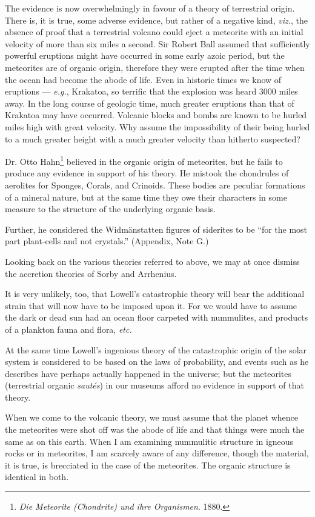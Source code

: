 \documentclass[a4paper, 12pt, oneside]{article}
\begin{document}
The evidence is now overwhelmingly in favour of a theory of terrestrial origin. There is, it is true, some adverse evidence, but rather of a negative kind, \emph{viz.}, the absence of proof that a terrestrial volcano could eject a meteorite with an initial velocity of more than six miles a second. Sir Robert Ball assumed that sufficiently powerful eruptions might have occurred in some early azoic period, but the meteorites are of organic origin, therefore they were erupted after the time when the ocean had become the abode of life. Even in historic times we know of eruptions --- \emph{e.g.}, Krakatoa, so terrific that the explosion was heard 3000 miles away. In the long course of geologic time, much greater eruptions than that of Krakatoa may have occurred. Volcanic blocks and bombs are known to be hurled miles high with great velocity. Why assume the impossibility of their being hurled to a much greater height with a much greater velocity than hitherto suspected?

Dr. Otto Hahn\footnote{\emph{Die Meteorite (Chondrite) und ihre Organismen}. 1880.} believed in the organic origin of meteorites, but he fails to produce any evidence in support of his theory. He mistook the chondrules of aerolites for Sponges, Corals, and Crinoids. These bodies are peculiar formations of a mineral nature, but at the same time they owe their characters in some measure to the structure of the underlying organic basis.

Further, he considered the Widmänstatten figures of siderites to be ``for the most part plant-cells and not crystals.'' (Appendix, Note G.)

Looking back on the various theories referred to above, we may at once dismiss the accretion theories of Sorby and Arrhenius.

It is very unlikely, too, that Lowell's catastrophic theory will bear the additional strain that will now have to be imposed upon it. For we would have to assume the dark or dead sun had an ocean floor carpeted with nummulites, and products of a plankton fauna and flora, \emph{etc.}

At the same time Lowell's ingenious theory of the catastrophic origin of the solar system is considered to be based on the laws of probability, and events such as he describes have perhaps actually happened in the universe; but the meteorites (terrestrial organic \emph{sautés}) in our museums afford no evidence in support of that theory.

When we come to the volcanic theory, we must assume that the planet whence the meteorites were shot off was the abode of life and that things were much the same as on this earth. When I am examining nummulitic structure in igneous rocks or in meteorites, I am scarcely aware of any difference, though the material, it is true, is brecciated in the case of the meteorites. The organic structure is identical in both.
\end{document}
